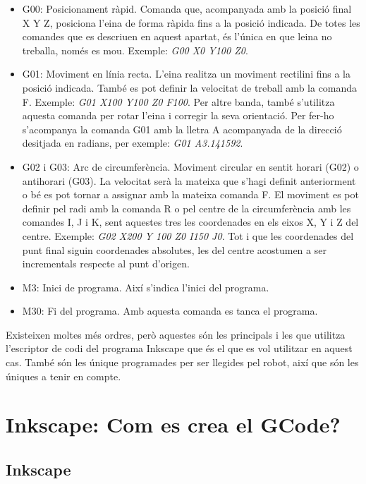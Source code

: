 \begin{itemize}
	\item	G00: Posicionament ràpid. Comanda que, acompanyada amb la posició final X Y Z, posiciona l'eina de forma ràpida fins a la posició indicada. De totes les comandes que es descriuen en aquest apartat, és l'única en que leina no treballa, només es mou. Exemple: \emph{G00 X0 Y100 Z0}.
	
	\item	G01: Moviment en línia recta. L'eina realitza un moviment rectilini fins a la posició indicada. També es pot definir la velocitat de treball amb la comanda F. Exemple: \emph{G01 X100 Y100 Z0 F100}. Per altre banda, també s'utilitza aquesta comanda per rotar l'eina i corregir la seva orientació. Per fer-ho s'acompanya la comanda G01 amb la lletra A acompanyada de la direcció desitjada en radians, per exemple: \emph{G01 A3.141592}.
	
	\item	G02 i G03: Arc de circumferència.  Moviment circular en sentit horari (G02) o antihorari (G03). La velocitat serà la mateixa que s'hagi definit anteriorment o bé es pot tornar a assignar amb la mateixa comanda F. El moviment es pot definir pel radi amb la comanda R o pel centre de la circumferència amb les comandes I, J i K, sent aquestes tres les coordenades en els eixos X, Y i Z del centre. Exemple: \emph{G02 X200 Y 100 Z0 I150 J0}. Tot i que les coordenades del punt final siguin coordenades absolutes, les del centre acostumen a ser incrementals respecte al punt d'origen.
	
	\item	M3: Inici de programa. Així s'indica l'inici del programa.
	
	\item	M30: Fi del programa. Amb aquesta comanda es tanca el programa. 
\end{itemize}
Existeixen moltes més ordres, però aquestes són les principals i les que utilitza l'escriptor de codi  del programa Inkscape que és el que es vol utilitzar en aquest cas. També són les únique programades per ser llegides pel robot, així que són les úniques a tenir en compte. 



\section{Inkscape: Com es crea el GCode?}

\subsection{Inkscape}


